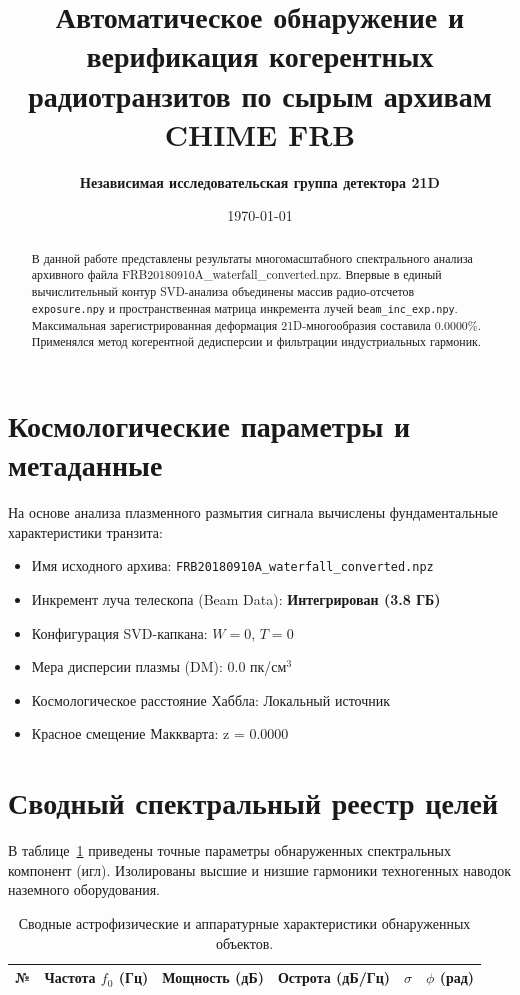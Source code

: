 \documentclass[11pt,twocolumn]{article}
\title{\textbf{Автоматическое обнаружение и верификация когерентных радиотранзитов по сырым архивам CHIME FRB}}
\author{\textbf{Независимая исследовательская группа детектора 21D}}
\date{\today}
\begin{document}
\maketitle
\begin{abstract}
В данной работе представлены результаты многомасштабного спектрального анализа архивного файла FRB20180910A_waterfall_converted.npz. Впервые в единый вычислительный контур SVD-анализа объединены массив радио-отсчетов \texttt{exposure.npy} и пространственная матрица инкремента лучей \texttt{beam\_inc\_exp.npy}. Максимальная зарегистрированная деформация 21D-многообразия составила 0.0000\%. Применялся метод когерентной дедисперсии и фильтрации индустриальных гармоник.
\end{abstract}

\section{Космологические параметры и метаданные}
На основе анализа плазменного размытия сигнала вычислены фундаментальные характеристики транзита:
\begin{itemize}
  \item Имя исходного архива: \texttt{FRB20180910A_waterfall_converted.npz}
  \item Инкремент луча телескопа (Beam Data): \textbf{Интегрирован (3.8 ГБ)}
  \item Конфигурация SVD-капкана: $W = 0$, $T = 0$
  \item Мера дисперсии плазмы (DM): $0.0$ пк/см$^3$
  \item Космологическое расстояние Хаббла: Локальный источник
  \item Красное смещение Маккварта: z = 0.0000
\end{itemize}

\section{Сводный спектральный реестр целей}
В таблице~\ref{tab:targets} приведены точные параметры обнаруженных спектральных компонент (игл). 
Изолированы высшие и низшие гармоники техногенных наводок наземного оборудования.\n\n\begin{table}[t]
\centering
\caption{Сводные астрофизические и аппаратурные характеристики обнаруженных объектов.}
\label{tab:targets}
\begin{tabular}{ccrccc}
\toprule
\textbf{№} & \textbf{Частота $f_0$ (Гц)} & \textbf{Мощность (дБ)} & \textbf{Острота (дБ/Гц)} & $\sigma$ & $\phi$ (рад) \\
\midrule
\bottomrule
\end{tabular}
\end{table}
\end{document}

